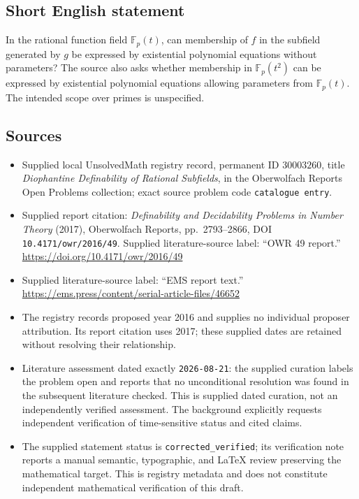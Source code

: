 \documentclass[11pt]{article}
\newcommand{\F}{\mathbb{F}}
\begin{document}
\subsection{Short English statement}
In the rational function field \(\F_p(t)\), can membership of \(f\) in the subfield generated by \(g\) be expressed by existential polynomial equations without parameters? The source also asks whether membership in \(\F_p(t^2)\) can be expressed by existential polynomial equations allowing parameters from \(\F_p(t)\). The intended scope over primes is unspecified.
\subsection{Sources}
\begin{itemize}
\item Supplied local UnsolvedMath registry record, permanent ID \(30003260\), title \emph{Diophantine Definability of Rational Subfields}, in the Oberwolfach Reports Open Problems collection; exact source problem code \texttt{catalogue entry}.
\item Supplied report citation: \emph{Definability and Decidability Problems in Number Theory} (2017), Oberwolfach Reports, pp.~2793--2866, DOI \texttt{10.4171/owr/2016/49}. Supplied literature-source label: ``OWR 49 report.'' \url{https://doi.org/10.4171/owr/2016/49}
\item Supplied literature-source label: ``EMS report text.'' \url{https://ems.press/content/serial-article-files/46652}
\item The registry records proposed year 2016 and supplies no individual proposer attribution. Its report citation uses 2017; these supplied dates are retained without resolving their relationship.
\item Literature assessment dated exactly \texttt{2026-08-21}: the supplied curation labels the problem open and reports that no unconditional resolution was found in the subsequent literature checked. This is supplied dated curation, not an independently verified assessment. The background explicitly requests independent verification of time-sensitive status and cited claims.
\item The supplied statement status is \texttt{corrected\_verified}; its verification note reports a manual semantic, typographic, and LaTeX review preserving the mathematical target. This is registry metadata and does not constitute independent mathematical verification of this draft.
\end{itemize}
\end{document}
